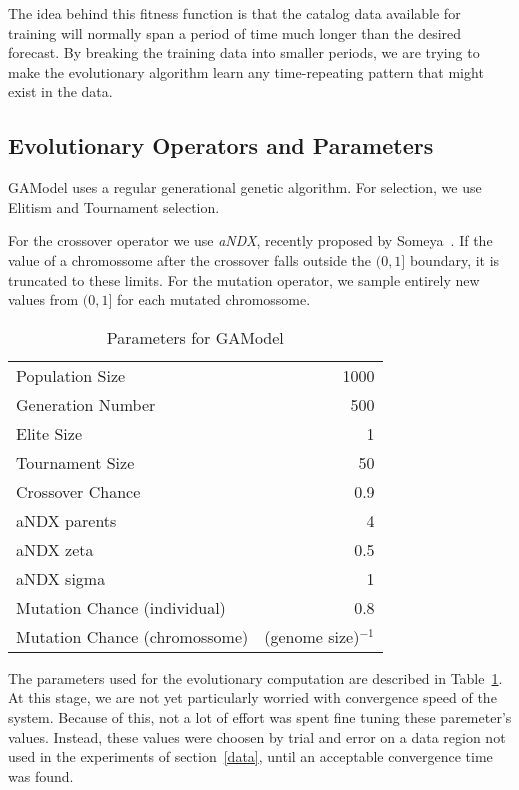 \documentclass{sig-alternate}
\begin{document}
The idea behind this fitness function is that the catalog data
available for training will normally span a period of time much longer
than the desired forecast. By breaking the training data into smaller
periods, we are trying to make the evolutionary algorithm learn any
time-repeating pattern that might exist in the data.

\subsection{Evolutionary Operators and Parameters} %

GAModel uses a regular generational genetic algorithm. For selection,
we use Elitism and Tournament selection. 

For the crossover operator we use \emph{aNDX}, recently proposed by
Someya~\cite{Someya2013}. If the value of a chromossome after the
crossover falls outside the $(0,1]$ boundary, it is truncated to these
  limits. For the mutation operator, we sample entirely new values
  from $(0,1]$ for each mutated chromossome.

\begin{table}[!h]
  \begin{center}
  \begin{tabular}{|l|r|}
    \hline
    Population Size & 1000\\
    Generation Number & 500\\
    Elite Size & 1\\
    Tournament Size & 50\\
    Crossover Chance & 0.9\\
    aNDX parents & 4\\
    aNDX zeta & 0.5\\
    aNDX sigma & 1\\
    Mutation Chance (individual) & 0.8\\
    Mutation Chance (chromossome) & (genome size)$^{-1}$\\
    \hline    
  \end{tabular}
  \end{center}
  \caption{Parameters for GAModel}
  \label{GAParameters}
\end{table}

The parameters used for the evolutionary computation are described in
Table~\ref{GAParameters}. At this stage, we are not yet particularly
worried with convergence speed of the system. Because of this, not a
lot of effort was spent fine tuning these paremeter's values. Instead,
these values were choosen by trial and error on a data region not used
in the experiments of section~\ref{data}, until an acceptable
convergence time was found.
\end{document}
